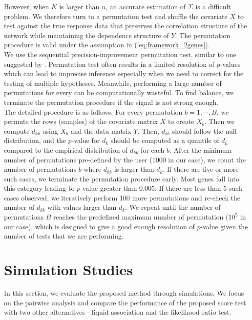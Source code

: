 \documentclass[aap,authoryear, preprint]{imsart}
\numberwithin{equation}{section}
\theoremstyle{plain}
\begin{document}
However, when $K$ is larger than $n$, an accurate estimation of $\Sigma$ is a difficult problem. We therefore turn to a permutation test and shuffle the covariate $X$ to test against the true response data that preserves the correlation structure of the network while maintaining the dependence structure of $Y$. The permutation procedure is valid under the assumption in (\ref{eq:framework_2genes}). \\

We use the sequential precision-improvement permutation test, similar to one suggested by \cite{chen2012exponential}. Permutation test often results in a limited resolution of $p$-values which can lead to imprecise inference especially when we need to correct for the testing of multiple hypotheses. Meanwhile, performing a large number of permutations for every can be computationally wasteful. To find balance, we terminate the permutation procedure if the signal is not strong enough. \\

The detailed procedure is as follows. For every permutation $b = 1, \cdots, B$, we permute the rows (samples) of the covariate matrix $X$ to create $X_b$. Then we compute $d_{kb}$ using $X_b$ and the data matrix $Y$. Then, $d_{kb}$ should follow the null distribution, and the $p$-value for $d_k$ should be computed as a quantile of $d_k$ compared to the empirical distribution of $d_{kb}$ for each $b$. After the minimum number of permutations pre-defined by the user (1000 in our case), we count the number of permutations $b$ where $d_{kb}$ is larger than $d_k$. If there are five or more such cases, we terminate the permutation procedure early. Most genes fall into this category leading to $p$-value greater than 0.005. If there are less than 5 such cases observed, we iteratively perform 100 more permutations and re-check the number of $d_{kb}$ with values larger than $d_k$. We repeat until the number of permutations $B$ reaches the predefined maximum number of permutation ($10^5$ in our case), which is designed to give a good enough resolution of $p$-value given the number of tests that we are performing.

\section{Simulation Studies} \label{simulations}
In this section, we evaluate the proposed method through simulations. We focus on the pairwise analysis and compare the performance of the proposed score test with two other alternatives - liquid association and the likelihood ratio test. \\
\end{document}
